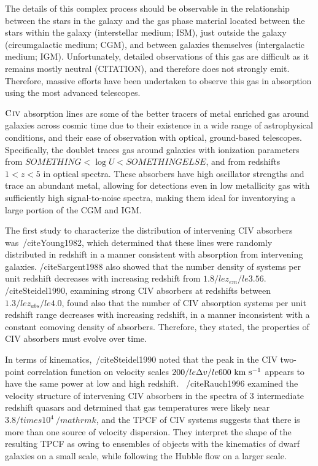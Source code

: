 \documentclass[linenumbers,twocolumn]{aastex61}
\begin{document}
The details of this complex process should be observable in the relationship between the stars in the galaxy and the gas phase material located between the stars within the galaxy (interstellar medium; ISM), just outside the galaxy (circumgalactic medium; CGM), and between galaxies themselves (intergalactic medium; IGM). Unfortunately, detailed observations of this gas are difficult as it remains mostly neutral (CITATION), and therefore does not strongly emit. Therefore, massive efforts have been undertaken to observe this gas in absorption using the most advanced telescopes.

${\hbox{{\rm C}\kern 0.1em{\sc iv}}}$ absorption lines are some of the better tracers of metal enriched gas around galaxies across cosmic time due to their existence in a wide range of astrophysical conditions, and their ease of observation with optical, ground-based telescopes. Specifically, the {\CIVdblt} doublet traces gas around galaxies with ionization parameters from $SOMETHING < \log U < SOMETHING ELSE$, and from redshifts $1 < z < 5$ in optical spectra. These absorbers have high oscillator strengths and trace an abundant metal, allowing for detections even in low metallicity gas with sufficiently high signal-to-noise spectra, making them ideal for inventorying a large portion of the CGM and IGM.

The first study to characterize the distribution of intervening CIV absorbers was~/cite{Young1982}, which determined that these lines were randomly distributed in redshift in a manner consistent with absorption from intervening galaxies. /cite{Sargent1988} also showed that the number density of systems per unit redshift decreases with increasing redshift from $1.8 /le z_{em} /le 3.56$. /cite{Steidel1990}, examining strong CIV absorbers at redshifts between $1.3 /le z_{abs} /le 4.0$, found also that the number of CIV absorption systems per unit redshift range decreases with increasing redshift, in a manner inconsistent with a constant comoving density of absorbers. Therefore, they stated, the properties of CIV absorbers must evolve over time.

In terms of kinematics,~/cite{Steidel1990} noted that the peak in the CIV two-point correlation function on velocity scales $200 /le \Delta v /le 600~{\hbox{km~s$^{-1}$}}$ appears to have the same power at low and high redshift. ~/cite{Rauch1996} examined the velocity structure of intervening CIV absorbers in the spectra of 3 intermediate redshift quasars and detrmined that gas temperatures were likely near $3.8 /times 10^4~/mathrm{k}$, and the TPCF of CIV systems suggests that there is more than one source of velocity dispersion. They interpret the shape of the resulting TPCF as owing to ensembles of objects with the kinematics of dwarf galaxies on a small scale, while following the Hubble flow on a larger scale. %
\end{document}
